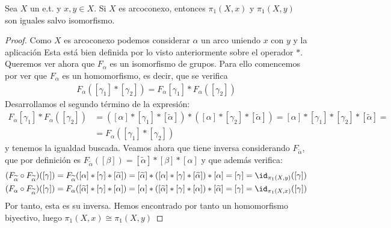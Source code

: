 \begin{teo}\label{teo:isomorfismo_grupo_fundamental}
    Sea $X$ un e.t. y $x,y\in X$. Si $X$ es arcoconexo, entonces $\pi_1(X,x)$ y $\pi_1(X,y)$ son iguales salvo isomorfismo.
    \begin{proof}
        Como $X$ es arcoconexo podemos considerar $\alpha$ un arco uniendo $x$ con $y$ y la aplicación
        Esta está bien definida por lo visto anteriormente sobre el operador $\ast$. Queremos ver ahora que $F_\alpha$ es un isomorfismo de grupos. Para ello comencemos por ver que $F_\alpha$ es un homomorfismo, es decir, que se verifica
        \begin{gather*}
            F_\alpha([\gamma_1] \ast [\gamma_2]) = F_\alpha[\gamma_1]\ast F_\alpha([\gamma_2])
        \end{gather*}
        Desarrollamos el segundo término de la expresión:
        \begin{align*}
            F_\alpha[\gamma_1]\ast F_\alpha([\gamma_2]) &= ([\alpha] \ast [\gamma_1] \ast \left[\tilde{\alpha}\right]) \ast ([\alpha] \ast [\gamma_2] \ast \left[\tilde{\alpha}\right]) = [\alpha] \ast [\gamma_1] \ast [\gamma_2] \ast \left[\tilde{\alpha}\right] =\\
            &= F_\alpha([\gamma_1] \ast [\gamma_2])
        \end{align*}
        y tenemos la igualdad buscada. Veamos ahora que tiene inversa considerando $F_{\tilde{\alpha}}$, que por definición es $F_{\tilde{\alpha}}([\beta]) = \left[\tilde{\alpha}\right] \ast [\beta] \ast [\alpha]$ y que además verifica:
        \begin{gather*}
            (F_{\tilde{\alpha}} \circ F_{\tilde{\alpha}})([\gamma]) = F_{\tilde{\alpha}}([\alpha]\ast [\gamma]\ast \left[\tilde{\alpha}\right]) = \left[\tilde{\alpha}\right] \ast ([\alpha]\ast [\gamma]\ast \left[\tilde{\alpha}\right]) \ast [\alpha] = [\gamma] = \id_{\pi_1(X,y)}([\gamma])\\
            (F_\alpha \circ F_{\tilde{\alpha}})([\gamma]) = F_\alpha(\left[\tilde{\alpha}\right] \ast [\gamma] \ast [\alpha]) = [\alpha] \ast (\left[\tilde{\alpha}\right] \ast [\gamma] \ast [\alpha]) \ast \left[\tilde{\alpha}\right] = [\gamma] = \id_{\pi_1(X,x)}([\gamma])
        \end{gather*}
        Por tanto, esta es su inversa. Hemos encontrado por tanto un homomorfismo biyectivo, luego $\pi_1(X,x) \cong \pi_1(X,y)$
    \end{proof}
\end{teo}

